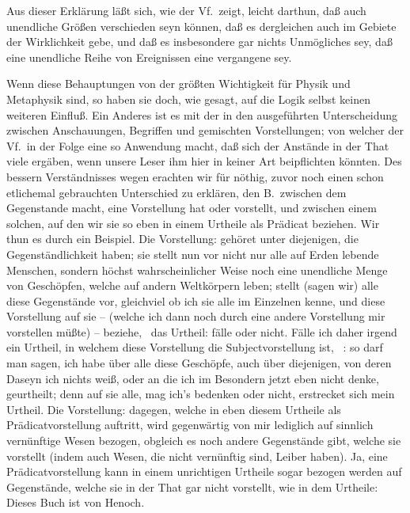 Aus dieser Erklärung läßt sich, wie der Vf.\ zeigt, leicht darthun, daß auch unendliche Größen verschieden seyn können, daß es dergleichen auch im Gebiete der Wirklichkeit gebe, und daß es insbesondere gar nichts Unmögliches sey, daß eine unendliche Reihe von Ereignissen eine vergangene sey. \par
Wenn diese Behauptungen von der größten Wichtigkeit für Physik und Metaphysik sind, so haben sie doch, wie gesagt, auf die Logik selbst keinen weiteren Einfluß. Ein Anderes ist es mit der in den  ausgeführten Unterscheidung zwischen Anschauungen, Begriffen und gemischten Vorstellungen; von welcher der Vf.\ in der Folge eine so  Anwendung macht, daß sich der Anstände in der That viele ergäben, wenn unsere Leser ihm hier in keiner Art beipflichten könnten. Des bessern Verständnisses wegen erachten wir für nöthig, zuvor noch einen schon etlichemal gebrauchten Unterschied zu erklären, den B.\ zwischen dem Gegenstande macht,  eine Vorstellung hat oder vorstellt, und zwischen einem solchen, auf den wir sie so eben in einem Urtheile als Prädicat beziehen. Wir thun es durch ein Beispiel. Die Vorstellung:  gehöret unter diejenigen, die Gegenständlichkeit haben; sie stellt nun vor nicht nur alle auf Erden lebende Menschen, sondern höchst wahrscheinlicher Weise noch eine unendliche Menge von Geschöpfen, welche auf andern Weltkörpern leben; stellt (sagen wir) alle diese Gegenstände vor, gleichviel ob ich sie alle im Einzelnen kenne, und diese Vorstellung auf sie -- (welche ich dann noch durch eine andere Vorstellung mir vorstellen müßte) -- beziehe, \dh\  das Urtheil:  fälle oder nicht. Fälle ich daher irgend ein Urtheil, in welchem diese Vorstellung die Subjectvorstellung ist, \zB\ : so darf man sagen, ich habe über alle diese Geschöpfe, auch über diejenigen, von deren Daseyn ich nichts weiß, oder an die ich im Besondern jetzt eben nicht denke, geurtheilt; denn auf sie alle, mag ich's bedenken oder nicht, erstrecket sich mein Urtheil. Die Vorstellung:  dagegen, welche in eben  diesem Urtheile als Prädicatvorstellung auftritt, wird gegenwärtig von mir lediglich auf sinnlich vernünftige Wesen bezogen, obgleich es noch andere Gegenstände gibt, welche sie vorstellt (indem auch Wesen, die nicht vernünftig sind, Leiber haben). Ja, eine Prädicatvorstellung kann in einem unrichtigen Urtheile sogar bezogen werden auf Gegenstände, welche sie in der That gar nicht vorstellt, wie in dem Urtheile: Dieses Buch ist von Henoch. \par
